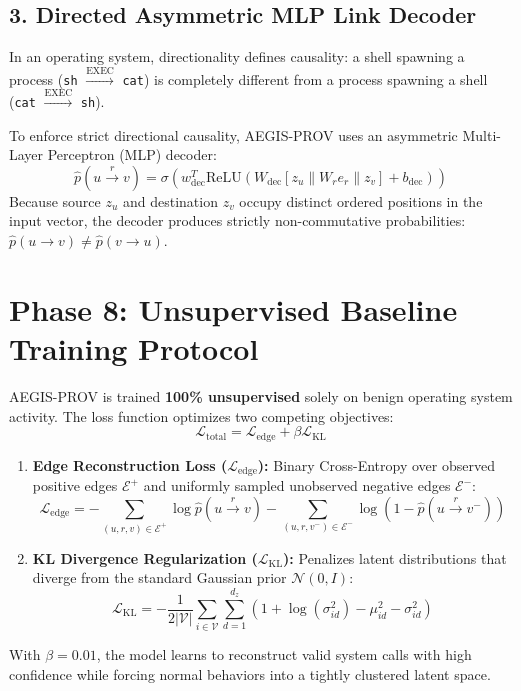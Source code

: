 \documentclass[11pt,a4paper]{report}
\begin{document}
\subsection{3. Directed Asymmetric MLP Link Decoder}
In an operating system, directionality defines causality: a shell spawning a process (\texttt{sh} $\xrightarrow{\text{EXEC}}$ \texttt{cat}) is completely different from a process spawning a shell (\texttt{cat} $\xrightarrow{\text{EXEC}}$ \texttt{sh}).

To enforce strict directional causality, AEGIS-PROV uses an asymmetric Multi-Layer Perceptron (MLP) decoder:
$$\hat{p}(u \xrightarrow{r} v) = \sigma\left( w_{\text{dec}}^T \text{ReLU}\left( W_{\text{dec}} [z_u \parallel W_r e_r \parallel z_v] + b_{\text{dec}} \right) \right)$$
Because source $z_u$ and destination $z_v$ occupy distinct ordered positions in the input vector, the decoder produces strictly non-commutative probabilities: $\hat{p}(u \to v) \ne \hat{p}(v \to u)$.

\section{Phase 8: Unsupervised Baseline Training Protocol}
AEGIS-PROV is trained \textbf{100\% unsupervised} solely on benign operating system activity. The loss function optimizes two competing objectives:
$$\mathcal{L}_{\text{total}} = \mathcal{L}_{\text{edge}} + \beta \mathcal{L}_{\text{KL}}$$
\begin{enumerate}
    \item \textbf{Edge Reconstruction Loss ($\mathcal{L}_{\text{edge}}$):} Binary Cross-Entropy over observed positive edges $\mathcal{E}^+$ and uniformly sampled unobserved negative edges $\mathcal{E}^-$:
    $$\mathcal{L}_{\text{edge}} = -\sum_{(u, r, v) \in \mathcal{E}^+} \log \hat{p}(u \xrightarrow{r} v) - \sum_{(u, r, v^-) \in \mathcal{E}^-} \log(1 - \hat{p}(u \xrightarrow{r} v^-))$$
    \item \textbf{KL Divergence Regularization ($\mathcal{L}_{\text{KL}}$):} Penalizes latent distributions that diverge from the standard Gaussian prior $\mathcal{N}(0, I)$:
    $$\mathcal{L}_{\text{KL}} = -\frac{1}{2 |\mathcal{V}|} \sum_{i \in \mathcal{V}} \sum_{d=1}^{d_z} \left( 1 + \log(\sigma_{id}^2) - \mu_{id}^2 - \sigma_{id}^2 \right)$$
\end{enumerate}
With $\beta = 0.01$, the model learns to reconstruct valid system calls with high confidence while forcing normal behaviors into a tightly clustered latent space.
\end{document}
